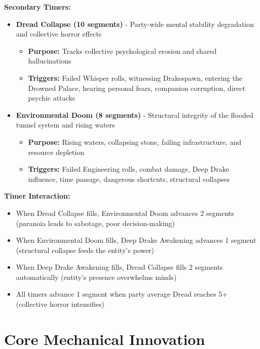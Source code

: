 \documentclass[11pt]{article}
\begin{document}
\textbf{Secondary Timers:}
\begin{itemize}
\item \textbf{Dread Collapse (10 segments)} - Party-wide mental stability degradation and collective horror effects
  \begin{itemize}
  \item \textbf{Purpose:} Tracks collective psychological erosion and shared hallucinations
  \item \textbf{Triggers:} Failed Whisper rolls, witnessing Drakespawn, entering the Drowned Palace, hearing personal fears, companion corruption, direct psychic attacks
  \end{itemize}
\item \textbf{Environmental Doom (8 segments)} - Structural integrity of the flooded tunnel system and rising waters
  \begin{itemize}
  \item \textbf{Purpose:} Rising waters, collapsing stone, failing infrastructure, and resource depletion
  \item \textbf{Triggers:} Failed Engineering rolls, combat damage, Deep Drake influence, time passage, dangerous shortcuts, structural collapses
  \end{itemize}
\end{itemize}

\textbf{Timer Interaction:}
\begin{itemize}
\item When Dread Collapse fills, Environmental Doom advances 2 segments (paranoia leads to sabotage, poor decision-making)
\item When Environmental Doom fills, Deep Drake Awakening advances 1 segment (structural collapse feeds the entity's power)
\item When Deep Drake Awakening fills, Dread Collapse fills 2 segments automatically (entity's presence overwhelms minds)
\item All timers advance 1 segment when party average Dread reaches 5+ (collective horror intensifies)
\end{itemize}

\section{Core Mechanical Innovation}
\end{document}
